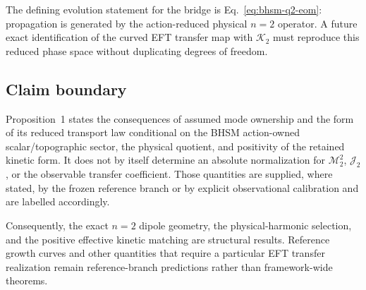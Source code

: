 The defining evolution statement for the bridge is
Eq.~\eqref{eq:bhsm-q2-eom}: propagation is generated by the action-reduced
physical $n=2$ operator.  A future exact identification of the curved EFT
transfer map with $\mathcal K_2$ must reproduce this reduced phase space
without duplicating degrees of freedom.

\subsection{Claim boundary}

Proposition~1 states the consequences of assumed mode ownership and the form of its reduced
transport law conditional on the BHSM action-owned scalar/topographic sector,
the physical quotient, and positivity of the retained kinetic form.  It does
not by itself determine an absolute normalization for
$\mathcal M_2^2$, $\mathcal J_2$, or the observable transfer coefficient.
Those quantities are supplied, where stated, by the frozen reference branch
or by explicit observational calibration and are labelled accordingly.

Consequently, the exact $n=2$ dipole geometry, the physical-harmonic
selection, and the positive effective kinetic matching are structural results.
Reference growth curves and other quantities that require a particular EFT
transfer realization remain reference-branch predictions rather than
framework-wide theorems.
